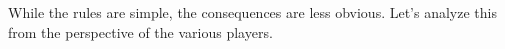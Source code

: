 While the rules are simple, the consequences are less obvious. Let's analyze
this from the perspective of the various players.

